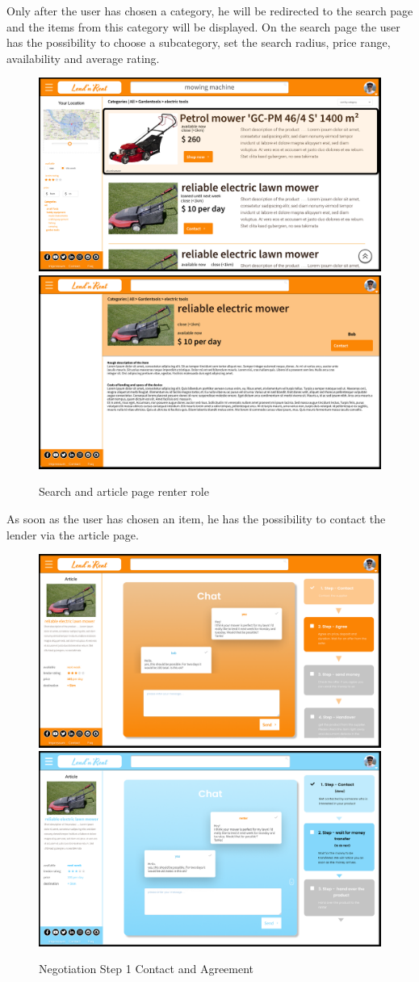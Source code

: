 \noindent
Only after the user has chosen a category, he will be redirected to the search page and the items from this category will be displayed.
On the search page the user has the possibility to choose a subcategory, set the search radius, price range, availability and average rating.

\begin{figure}[H]
	\centering
	\includegraphics[width=0.49\linewidth]{abb/9search}
	\includegraphics[width=0.49\linewidth]{abb/10itemrent}
	\caption{Search and article page renter role}
	\label{fig:search}
	\centering
\end{figure}

\newpage
\noindent
As soon as the user has chosen an item, he has the possibility to contact the lender via the article page.

\begin{figure}[H]
	\centering
	\includegraphics[width=0.49\linewidth]{abb/12step2}
	\includegraphics[width=0.49\linewidth]{abb/5step1}
	\caption{Negotiation Step 1 Contact and Agreement}
	\label{fig:negotiation1}
	\centering
\end{figure}

